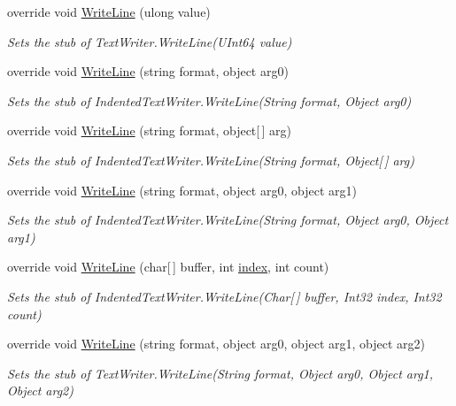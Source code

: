 \begin{DoxyCompactItemize}
override void \hyperlink{class_system_1_1_code_dom_1_1_compiler_1_1_fakes_1_1_stub_indented_text_writer_afa12ff28ddc70330f02dd6811abdfbdf}{Write\-Line} (ulong value)
\begin{DoxyCompactList}\small\item\em Sets the stub of Text\-Writer.\-Write\-Line(\-U\-Int64 value)\end{DoxyCompactList}\item 
override void \hyperlink{class_system_1_1_code_dom_1_1_compiler_1_1_fakes_1_1_stub_indented_text_writer_a1bd3d960b2769b79164409cdb080fe3a}{Write\-Line} (string format, object arg0)
\begin{DoxyCompactList}\small\item\em Sets the stub of Indented\-Text\-Writer.\-Write\-Line(\-String format, Object arg0)\end{DoxyCompactList}\item 
override void \hyperlink{class_system_1_1_code_dom_1_1_compiler_1_1_fakes_1_1_stub_indented_text_writer_a2fc28d0eb2743f78ebc55136024b7926}{Write\-Line} (string format, object\mbox{[}$\,$\mbox{]} arg)
\begin{DoxyCompactList}\small\item\em Sets the stub of Indented\-Text\-Writer.\-Write\-Line(\-String format, Object\mbox{[}$\,$\mbox{]} arg)\end{DoxyCompactList}\item 
override void \hyperlink{class_system_1_1_code_dom_1_1_compiler_1_1_fakes_1_1_stub_indented_text_writer_ac0f98ee20c513e86e0d93e5d4291182a}{Write\-Line} (string format, object arg0, object arg1)
\begin{DoxyCompactList}\small\item\em Sets the stub of Indented\-Text\-Writer.\-Write\-Line(\-String format, Object arg0, Object arg1)\end{DoxyCompactList}\item 
override void \hyperlink{class_system_1_1_code_dom_1_1_compiler_1_1_fakes_1_1_stub_indented_text_writer_a30fd1a3ed2edc6603f56df7d4e79a13c}{Write\-Line} (char\mbox{[}$\,$\mbox{]} buffer, int \hyperlink{jquery-1_810_82-vsdoc_8js_a75bb12d1f23302a9eea93a6d89d0193e}{index}, int count)
\begin{DoxyCompactList}\small\item\em Sets the stub of Indented\-Text\-Writer.\-Write\-Line(\-Char\mbox{[}$\,$\mbox{]} buffer, Int32 index, Int32 count)\end{DoxyCompactList}\item 
override void \hyperlink{class_system_1_1_code_dom_1_1_compiler_1_1_fakes_1_1_stub_indented_text_writer_a37e34f9db16c21b18a6cbda250a9bb85}{Write\-Line} (string format, object arg0, object arg1, object arg2)
\begin{DoxyCompactList}\small\item\em Sets the stub of Text\-Writer.\-Write\-Line(\-String format, Object arg0, Object arg1, Object arg2)\end{DoxyCompactList}\end{DoxyCompactItemize}
